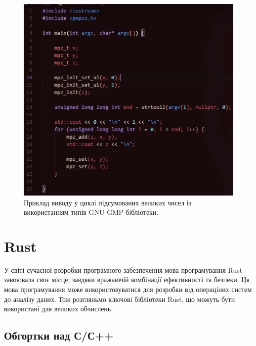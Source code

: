 \begin{itemize}
	\begin{figure}[!h]
    		\centering
    		\includegraphics[scale = 0.47]{IMAGES/Rust/gnu_gmp}
    		\caption{Приклад виводу у циклі підсумованих великих чисел із використанням  типів GNU GMP бібліотеки.}
    		\label{fig:}
	\end{figure}
\end{itemize}


\section{Rust}

У світі сучасної розробки програмного забезпечення мова програмування Rust завоювала своє місце, завдяки вражаючій комбінації ефективності та безпеки. Ця мова програмування може використовуватися для розробки від операціних систем до аналізу даних. Тож розгляньмо ключові бібліотеки Rust, що можуть бути використані для великих обчислень.

\subsection{Обгортки над С/С++}

